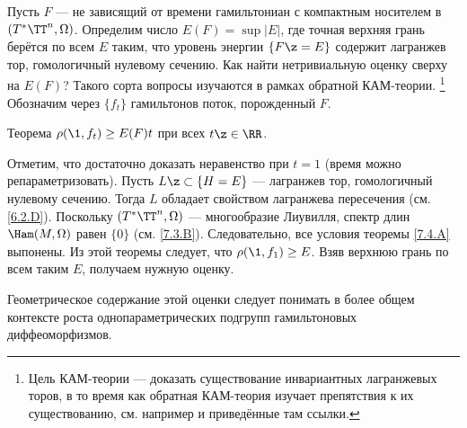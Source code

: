 Пусть $F$ --- не зависящий от времени гамильтониан с компактным
носителем в $(T^\ast \TT^n, \Omega)$. 
Определим число $E (F) = \sup | E |$, где точная верхняя грань берётся
по всем $E$ таким, что уровень энергии $\{F \z= E\}$ содержит
лагранжев тор, гомологичный нулевому сечению. 
Как найти нетривиальную оценку сверху на $E (F)$?
Такого сорта вопросы изучаются в рамках обратной КАМ-теории.%
\footnote{Цель КАМ-теории --- доказать существование инвариантных
  лагранжевых торов, в то время как обратная КАМ-теория изучает
  препятствия к их существованию, см. например \cite{Mac} и
  приведённые там ссылки.} 
Обозначим через $\{f_t\}$ гамильтонов поток, порожденный $F$.

\begin{thm}{Теорема}\label{8.1.C}
  $\rho (\1, f_t) \ge E (F) t$ при всех $t \z\in \RR$.
\end{thm}

Отметим, что достаточно доказать неравенство при $t = 1$ (время можно
репараметризовать).  
Пусть $L \z\subset \{H = E\}$ --- лагранжев тор, гомологичный нулевому сечению.
Тогда $L$ обладает свойством  лагранжева пересечения
(см. \ref{6.2.D}). 
Поскольку $(T^\ast \TT^n, \Omega)$ --- многообразие Лиувилля, спектр
длин $\Ham (M, \Omega)$ равен $\{0\}$ (см. \ref{7.3.B}). 
Следовательно, все условия теоремы \ref{7.4.A} выпонены. 
Из этой теоремы следует, что $\rho (\1, f_1) \ge E$. 
Взяв верхнюю грань по всем таким $E$, получаем нужную оценку.
\qeds

Геометрическое содержание этой оценки следует понимать в более общем
контексте роста однопараметрических подгрупп гамильтоновых
диффеоморфизмов. 


